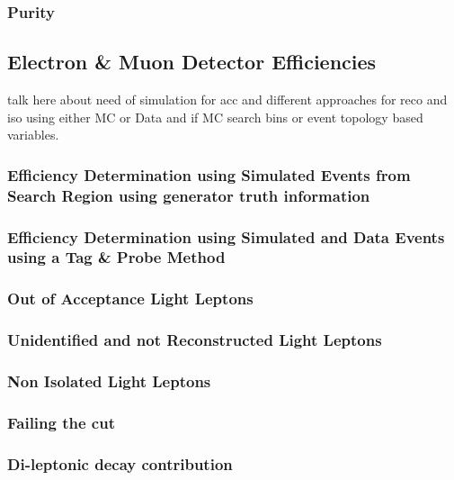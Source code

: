 \subsubsection{Purity}
\label{sec:Lost_Lepton_8TeV_CS_Purity}
\subsection{Electron \& Muon Detector Efficiencies}
\label{sec:Lost_Lepton_8TeV_Efficiencies_Main}
\todo talk here about need of simulation for acc and different approaches for reco and iso using either MC or Data and if MC search bins or event topology based variables.
\subsubsection{Efficiency Determination using Simulated Events from Search Region using generator truth information}
\label{sec:Lost_Lepton_8TeV_Efficiencies_Truth}
\subsubsection{Efficiency Determination using Simulated and Data Events using a Tag \& Probe Method}
\label{sec:Lost_Lepton_8TeV_Tag_Probe}

\subsubsection{Out of Acceptance Light Leptons}
\label{sec:Lost_Lepton_8TeV_Acc}

\subsubsection{Unidentified and not Reconstructed Light Leptons}
\label{sec:Lost_Lepton_8TeV_Reco}

\subsubsection{Non Isolated Light Leptons}
\label{sec:Lost_Lepton_8TeV_Iso}

\subsubsection{Failing the \mt cut}
\label{sec:Lost_Lepton_8TeV_MTCut}

\subsubsection{Di-leptonic \ttbar decay contribution}
\label{sec:Lost_Lepton_8TeV_Di_Lep}


